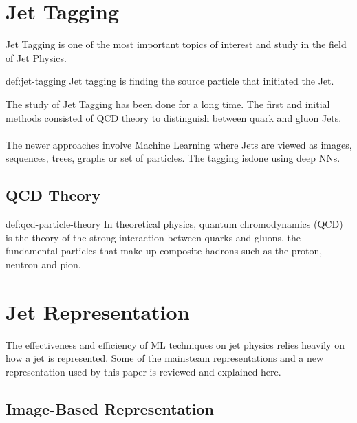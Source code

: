 
\section{Jet Tagging}
Jet Tagging is one of the most important topics of interest and study in the  field of Jet Physics.

\begin{definition}{def:jet-tagging}
    Jet tagging is finding the source particle that initiated the Jet.
\end{definition}

\noindent The study of Jet Tagging has been done for a long time. The first and initial methods consisted of QCD theory to distinguish between quark and gluon Jets.

\paragraph{} The newer approaches involve Machine Learning where Jets are viewed as images, sequences, trees, graphs or set of particles. The tagging isdone using deep NNs.

\subsection{QCD Theory}

\begin{definition}{def:qcd-particle-theory}
    In theoretical physics, quantum chromodynamics (QCD) is the theory of the strong interaction between quarks and gluons, the fundamental particles that make up composite hadrons such as the proton, neutron and pion.
\end{definition}

\section{Jet Representation}
The effectiveness and efficiency of ML techniques on jet physics relies 
heavily on how a jet is represented. Some of the mainsteam representations 
and a new representation used by this paper is reviewed and explained here.

\subsection{Image-Based Representation}


